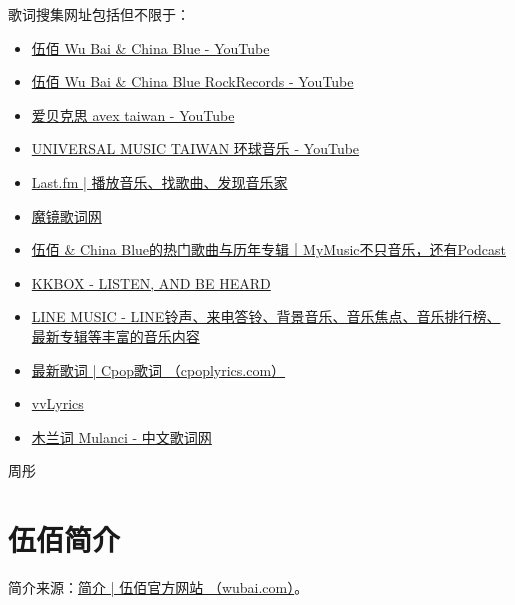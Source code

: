 \documentclass[UTF8,a4paper,oneside,twocolumn,12pt]{ctexbook}
\begin{document}
歌词搜集网址包括但不限于：
\begin{itemize}
	\item \href{https://www.youtube.com/channel/UCHocIer4qdnCmgvHlNrpqFA}{伍佰 Wu Bai \& China Blue - YouTube}
	\item \href{https://www.youtube.com/channel/UCCTYHJZvsRCLvm5Afi9XJXA}{伍佰 Wu Bai \& China Blue RockRecords - YouTube}
	\item \href{https://www.youtube.com/c/爱贝克思avextaiwan}{爱贝克思 avex taiwan - YouTube}
	\item \href{https://www.youtube.com/c/universaltwn/search?query=伍佰}{UNIVERSAL MUSIC TAIWAN 环球音乐 - YouTube}
	\item \href{https://www.last.fm/zh/}{Last.fm | 播放音乐、找歌曲、发现音乐家}
	\item \href{https://mojim.com/twznew.htm}{魔镜歌词网}
	\item \href{https://www.mymusic.net.tw/ux/w/singer/show/245}{伍佰 \& China Blue的热门歌曲与历年专辑｜MyMusic不只音乐，还有Podcast}
	\item \href{https://www.kkbox.com/tw/tc/}{KKBOX - LISTEN, AND BE HEARD}
	\item \href{https://music-tw.line.me/}{LINE MUSIC - LINE铃声、来电答铃、背景音乐、音乐焦点、音乐排行榜、最新专辑等丰富的音乐内容}
	\item \href{https://www.cpoplyrics.com/}{最新歌词 | Cpop歌词 （cpoplyrics.com）}
	\item \href{https://vvlyrics.com/}{vvLyrics}
	\item \href{https://www.mulanci.org/zht/}{木兰词 Mulanci - 中文歌词网}
\end{itemize}

\begin{flushright}
	周彤
\end{flushright}

\chapter*{伍佰简介}
简介来源：\href{http://wubai.com/biography/%e7%b0%a1%e4%bb%8b/}{简介 | 伍佰官方网站 （wubai.com）}。
\end{document}
